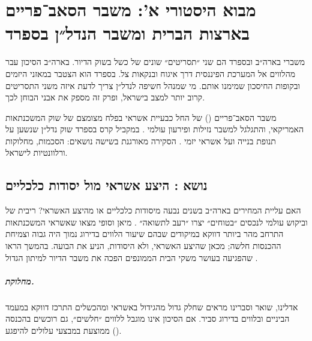 \chapter{מבוא היסטורי א': משבר הסאב־פריים בארצות הברית ומשבר הנדל״ן בספרד}
\label{ch:subprime}

\begin{managerbox}
משברי  בארה״ב ובספרד הם שני ״תסריטים״ שונים של כשל בשוק הדיור. בארה״ב הסיכון עבר מהלווים אל המערכת הפיננסית דרך איגוח ובנקאות צל. בספרד הוא הצטבר במאזני היזמים ובקופות החיסכון שמימנו אותם. מי שמנהל חשיפה לנדל״ן צריך לדעת איזה משני התסריטים קרוב יותר למצב בישראל, ופרק זה מספק את אבני הבוחן לכך.
\end{managerbox}

משבר הסאב־פריים () של  החל כבעיית אשראי בפלח מצומצם של שוק המשכנתאות האמריקאי, והתגלגל למשבר נזילות ופירעון עולמי \cite{fcic2011,brunnermeier2009}. במקביל קרס בספרד שוק נדל״ן שנשען על תנופת בנייה ועל אשראי יזמי \cite{akin2014,bde2017}. הסקירה מאורגנת בשישה נושאים: הסכמות, מחלוקות ורלוונטיות לישראל.

\section{נושא : היצע אשראי מול יסודות כלכליים}
\label{sec:ch2-credit}

האם עליית המחירים בארה״ב בשנים  נבעה מיסודות כלכליים או מהיצע האשראי? ריבית של  וביקוש עולמי לנכסים ״בטוחים״ יצרו ״רעב לתשואה״  \cite{brunnermeier2009}. מיאן וסופי \cite{mian2009} מצאו שאשראי המשכנתאות התרחב מהר ביותר דווקא במיקודים שבהם שיעור הלווים בדירוג נמוך היה גבוה וצמיחת ההכנסות חלשה; מכאן שהיצע האשראי, ולא היסודות, הניע את הבועה. בהמשך הראו שהפגיעה בעושר משקי הבית הממונפים הפכה את משבר הדיור למיתון הגדול \cite{mian2014}.

\paragraph{מחלוקת.} אדלינו, שואר וסברינו \cite{adelino2016} מראים שחלק גדול מהגידול באשראי ומהכשלים התרכז דווקא במעמד הביניים ובלווים בדירוג סביר. אם הסיכון אינו מוגבל ללווים ״חלשים״, גם רוכשים בהכנסה ממוצעת במבצעי  עלולים להיפגע ().

